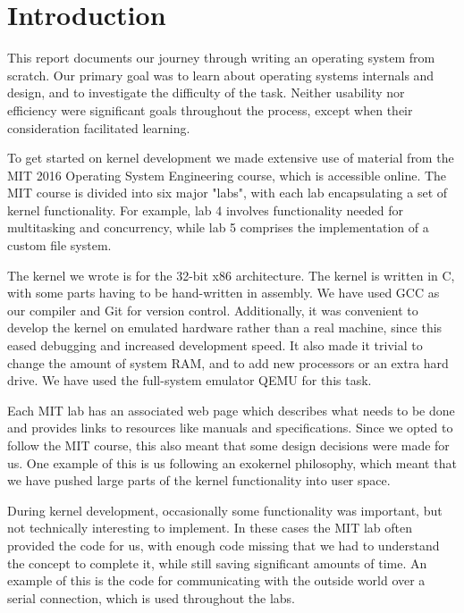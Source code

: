 \documentclass{report}
\begin{document}

\chapter{Introduction}
This report documents our journey through writing an operating system from
scratch. Our primary goal was to learn about operating systems internals and
design, and to investigate the difficulty of the task. Neither usability nor
efficiency were significant goals throughout the process, except when
their consideration facilitated learning.

To get started on kernel development we made extensive use of material from
the MIT 2016 Operating System Engineering course, which is accessible online.
The MIT course is divided into six major "labs", with each lab encapsulating a
set of kernel functionality. For example, lab 4 involves functionality needed
for multitasking and concurrency, while lab 5 comprises the implementation of
a custom file system. 

The kernel we wrote is for the 32-bit x86 architecture. The kernel is written
in C, with some parts having to be hand-written in assembly. 
We have used GCC as our compiler and Git for version
control. Additionally, it was convenient to develop the kernel on emulated
hardware rather than a real machine, since this eased debugging and increased
development speed. It also made it trivial to change the amount of system RAM,
and to add new processors or an extra hard drive. We have used the full-system
emulator QEMU for this task.

Each MIT lab has an associated web page which describes what needs to be done
and provides links to resources like manuals and specifications. Since we opted
to follow the MIT course, this also meant that some design decisions were made
for us. One example of this is us following an exokernel philosophy, which
meant that we have pushed large parts of the kernel functionality into user
space.

During kernel development, occasionally some functionality was important,
but not technically interesting to implement. In these cases the MIT lab often
provided the code for us, with enough code missing that we had to understand
the concept to complete it, while still saving significant amounts of time. An
example of this is the code for communicating with the outside world over a
serial connection, which is used throughout the labs.
\end{document}
